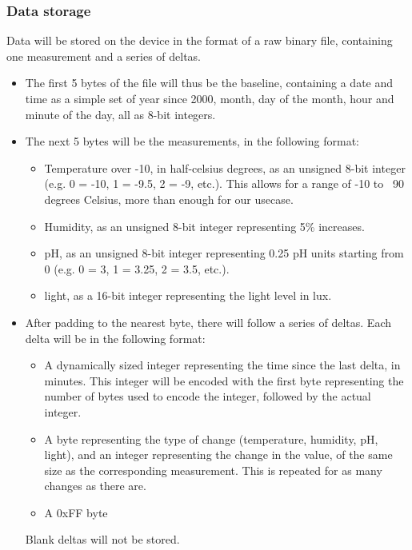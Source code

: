 \subsubsection*{Data storage}
Data will be stored on the device in the format of a raw binary file, containing 
one measurement and a series of deltas.
\begin{itemize}
    \item The first 5 bytes of the file will thus be the baseline, containing
a date and time as a simple set of year since 2000, month, day of the month,
hour and minute of the day, all as 8-bit integers.
    \item The next 5 bytes will be the measurements, in the following format:
    \begin{itemize}
        \item Temperature over -10, in half-celsius degrees, as an unsigned 8-bit
        integer (e.g. 0 = -10, 1 = -9.5, 2 = -9, etc.). This allows for a range
        of -10 to ~90 degrees Celsius, more than enough for our usecase.
        \item Humidity, as an unsigned 8-bit integer representing 5\% increases.
        \item pH, as an unsigned 8-bit integer representing 0.25 pH units starting
        from 0 (e.g. 0 = 3, 1 = 3.25, 2 = 3.5, etc.).
        \item light, as a 16-bit integer representing the light level in lux.
    \end{itemize}
    \item After padding to the nearest byte, there will follow a series of deltas.
    Each delta will be in the following format:
    \begin{itemize}
        \item A dynamically sized integer representing the time since the last delta,
        in minutes. This integer will be encoded with the first byte representing
        the number of bytes used to encode the integer, followed by the actual integer.
        \item A byte representing the type of change (temperature, humidity, pH, light),
        and an integer representing the change in the value, of the same size as 
        the corresponding measurement. This is repeated for as many changes as there
        are.
        \item A 0xFF byte
    \end{itemize}
    Blank deltas will not be stored.
\end{itemize}

